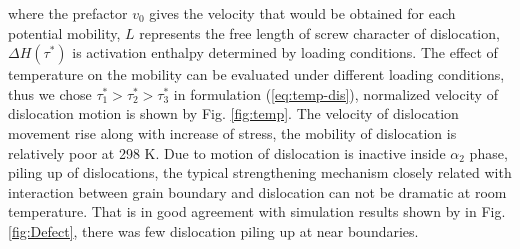 \documentclass[Unknown,article,submit,moreauthors,pdftex,10pt,a4paper]{Definitions/mdpi}
\begin{document}
where the prefactor $v_0$ gives the velocity that would be obtained for each potential mobility, $L$ represents the free length of screw character of dislocation, $\Delta H(\tau^*)$ is activation enthalpy determined by loading conditions. The effect of temperature on the mobility can be evaluated under different loading conditions, thus we chose  $\tau_1^*>\tau_2^*>\tau_3^*$ in formulation (\ref{eq:temp-dis}), normalized velocity of dislocation motion is shown by Fig. \ref{fig:temp}. The  velocity  of dislocation movement rise along with increase of  stress, the mobility  of dislocation is relatively poor at 298 K. Due to motion of dislocation is inactive inside $\alpha_2$ phase, piling up of dislocations, the typical strengthening mechanism closely related with interaction between grain boundary and dislocation can not be dramatic at room temperature. That is in good agreement with simulation results shown by in Fig. \ref{fig:Defect}, there was few dislocation piling up at near boundaries.
\end{document}
